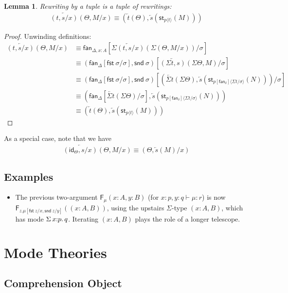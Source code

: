 \documentclass[10pt]{article}
\newtheorem{lemma}{Lemma}
\theoremstyle{definition}
\newcommand\dsd[1]{\ensuremath{\mathsf{#1}}}
\newcommand{\app}[2]{\ensuremath{#1 \: #2}}
\newcommand{\telety}[3]{\ensuremath{(#1{:}#2,#3)}}
\newcommand{\sigmacl}[3]{\ensuremath{\textnormal{$\Sigma$}\,#1{:}#2.\,#3}}
\newcommand{\fst}[1]{\app{\dsd{fst}}{#1}}
\newcommand{\snd}[1]{\app{\dsd{snd}}{#1}}
\newcommand\fan[1]{\ensuremath{\mathsf{fan}_{#1}}}
\newcommand{\id}{\mathsf{id}}
\newcommand{\rewrite}[2]{\overleftarrow{#1}(#2)}
\newcommand\F[2]{\ensuremath{\mathsf{F}_{#1}(#2)}}
\newcommand\StI[2]{\ensuremath{\mathsf{st}_{#1}(#2)}}
\newcommand\ap[2]{\ensuremath{#1 \langle #2 \rangle }}
\begin{document}
\begin{lemma}
Rewriting by a tuple is a tuple of rewritings:
\begin{align*}
\rewrite{(t, s/x)}{\Theta, M/x} \equiv (\rewrite{t}{\Theta}, \rewrite{s}{\StI{\ap{p}{t}}{M}})
\end{align*}
\end{lemma}
\begin{proof}
Unwinding definitions:
\begin{align*}
\rewrite{(t, s/x)}{\Theta, M/x}
&\equiv \fan{\Delta, x : A}[\rewrite{\Sigma (t, s/x)}{\Sigma (\Theta, M/x)}/\sigma] \\
&\equiv (\fan\Delta[\fst{\sigma}/\sigma], \snd{\sigma})[\rewrite{(\Sigma t, s)}{\Sigma\Theta, M}/\sigma] \\
&\equiv (\fan\Delta[\fst{\sigma}/\sigma], \snd{\sigma})[(\rewrite{\Sigma t}{\Sigma\Theta}, \rewrite{s}{\StI{\ap{p[\fan{\delta}]}{\Sigma t/\sigma}}{N}})/\sigma] \\
&\equiv (\fan\Delta[\rewrite{\Sigma t}{\Sigma\Theta}/\sigma], \rewrite{s}{\StI{\ap{p[\fan{\delta}]}{\Sigma t/\sigma}}{N}}) \\
&\equiv (\rewrite{t}{\Theta}, \rewrite{s}{\StI{\ap{p}{t}}{M}})
\end{align*}
\end{proof}

As a special case, note that we have
\begin{align*}
\rewrite{(\id_\Theta, s/x)}{\Theta, M/x} \equiv (\Theta, \rewrite{s}{M}/x)
\end{align*}

\subsection{Examples}

\begin{itemize}
\item 
The previous two-argument \F{\mu}{x:A,y:B} (for $x :p, y:q \vdash \mu :
r$) is now \F{z.\mu[\fst z/x,\snd z/y]}{\telety{x}{A}{B}}, using the
upstairs $\Sigma$-type ${\telety{x}{A}{B}}$, which has mode
$\sigmacl{x}{p}{q}$.  Iterating $\telety{x}{A}{B}$ plays the role of a
longer telescope.  
\end{itemize}

\section{Mode Theories}

\subsection{Comprehension Object}
\end{document}

